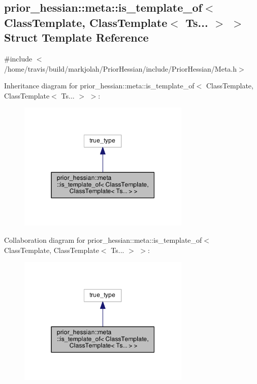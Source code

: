 \hypertarget{structprior__hessian_1_1meta_1_1is__template__of_3_01ClassTemplate_00_01ClassTemplate_3_01Ts_8_8_8_01_4_01_4}{}\subsection{prior\+\_\+hessian\+:\+:meta\+:\+:is\+\_\+template\+\_\+of$<$ Class\+Template, Class\+Template$<$ Ts... $>$ $>$ Struct Template Reference}
\label{structprior__hessian_1_1meta_1_1is__template__of_3_01ClassTemplate_00_01ClassTemplate_3_01Ts_8_8_8_01_4_01_4}


{\ttfamily \#include $<$/home/travis/build/markjolah/\+Prior\+Hessian/include/\+Prior\+Hessian/\+Meta.\+h$>$}



Inheritance diagram for prior\+\_\+hessian\+:\+:meta\+:\+:is\+\_\+template\+\_\+of$<$ Class\+Template, Class\+Template$<$ Ts... $>$ $>$\+:\nopagebreak
\begin{figure}[H]
\begin{center}
\leavevmode
\includegraphics[width=232pt]{structprior__hessian_1_1meta_1_1is__template__of_3_01ClassTemplate_00_01ClassTemplate_3_01Ts_8_8_8_01_4_01_4__inherit__graph}
\end{center}
\end{figure}


Collaboration diagram for prior\+\_\+hessian\+:\+:meta\+:\+:is\+\_\+template\+\_\+of$<$ Class\+Template, Class\+Template$<$ Ts... $>$ $>$\+:\nopagebreak
\begin{figure}[H]
\begin{center}
\leavevmode
\includegraphics[width=232pt]{structprior__hessian_1_1meta_1_1is__template__of_3_01ClassTemplate_00_01ClassTemplate_3_01Ts_8_8_8_01_4_01_4__coll__graph}
\end{center}
\end{figure}


